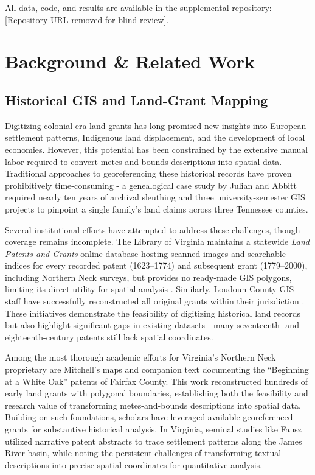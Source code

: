 All data, code, and results are available in the supplemental
repository:
\url{[Repository URL removed for blind review]}.

\section{Background \& Related Work}\label{background-related-work}

\subsection{Historical GIS and Land-Grant
Mapping}\label{historical-gis-and-land-grant-mapping}

Digitizing colonial-era land grants has long promised new insights into
European settlement patterns, Indigenous land displacement, and the
development of local economies. However, this potential has been
constrained by the extensive manual labor required to convert
metes-and-bounds descriptions into spatial data. Traditional approaches
to georeferencing these historical records have proven prohibitively
time-consuming - a genealogical case study by Julian and Abbitt
\citep{Julian2014_tennessee} required nearly ten years of archival
sleuthing and three university-semester GIS projects to pinpoint a
single family's land claims across three Tennessee counties.

Several institutional efforts have attempted to address these
challenges, though coverage remains incomplete. The Library of Virginia
maintains a statewide \emph{Land Patents and Grants} online database
hosting scanned images and searchable indices for every recorded patent
(1623--1774) and subsequent grant (1779--2000), including Northern Neck
surveys, but provides no ready-made GIS polygons, limiting its direct
utility for spatial analysis \citep{lva_patents_db}. Similarly, Loudoun
County GIS staff have successfully reconstructed all original grants
within their jurisdiction \citep{loudoun_grants_dataset}. These
initiatives demonstrate the feasibility of digitizing historical land
records but also highlight significant gaps in existing datasets - many
seventeenth- and eighteenth-century patents still lack spatial
coordinates.

Among the most thorough academic efforts for Virginia's Northern Neck
proprietary are Mitchell's \citep{mitchell1977whiteoak} maps and
companion text documenting the ``Beginning at a White Oak'' patents of
Fairfax County. This work reconstructed hundreds of early land grants
with polygonal boundaries, establishing both the feasibility and
research value of transforming metes-and-bounds descriptions into
spatial data. Building on such foundations, scholars have leveraged
available georeferenced grants for substantive historical analysis. In
Virginia, seminal studies like Fausz \citep{Fausz1971_settlement}
utilized narrative patent abstracts to trace settlement patterns along
the James River basin, while noting the persistent challenges of
transforming textual descriptions into precise spatial coordinates for
quantitative analysis.

